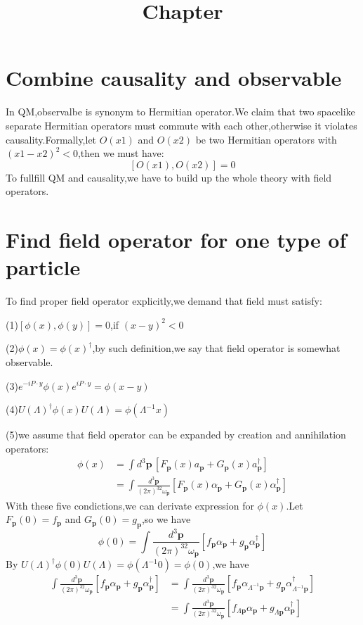 \documentclass[a4paper]{article}
\begin{document}
	\title{Chapter}
	\date{ }
	\maketitle
\section{Combine causality and observable}
In QM,observalbe is synonym to Hermitian operator.We claim that two spacelike separate Hermitian operators must commute with each other,otherwise it violates causality.Formally,let $O(x1)$ and $O(x2)$ be two Hermitian operators with $(x1-x2)^2<0$,then we must have:$$[O(x1),O(x2)]=0$$To fullfill QM and causality,we have to build up the whole theory with field operators.
\section{Find field operator for one type of particle}
To find proper field operator explicitly,we demand that field must satisfy:
\par (1)$[\phi(x),\phi(y)]=0$,if $(x-y)^2<0$
\par (2)$\phi(x)=\phi(x)^{\dagger}$,by such definition,we say that field operator is somewhat observable.
\par (3)$e^{-iP\cdot y}\phi(x)e^{iP\cdot y}=\phi(x-y)$
\par (4)$U(\Lambda)^{\dagger}\phi(x)U(\Lambda)=\phi(\Lambda^{-1}x)$
\par (5)we assume that field operator can be expanded by creation and annihilation operators:
\begin{align*}
	\phi(x)&=\int d^3\bm{p}\,[F_{\bm{p}}(x)a_{\bm{p}}+G_{\bm{p}}(x)a_{\bm{p}}^{\dagger}]\\
	&=\int\frac{d^3\bm{p}}{(2\pi)^32\omega_{\bm{p}}}[F_{\bm{p}}(x)\alpha_{\bm{p}}+G_{\bm{p}}(x)\alpha_{\bm{p}}^{\dagger}]
\end{align*}
With these five condictions,we can derivate expression for $\phi(x)$.Let $F_{\bm{p}}(0)=f_{\bm{p}}$ and $G_{\bm{p}}(0)=g_{\bm{p}}$,so we have
	$$\phi(0)=\int\frac{d^3\bm{p}}{(2\pi)^32\omega_{\bm{p}}}[f_{\bm{p}}\alpha_{\bm{p}}+g_{\bm{p}}\alpha_{\bm{p}}^{\dagger}]$$By $U(\Lambda)^{\dagger}\phi(0)U(\Lambda)=\phi(\Lambda^{-1}0)=\phi(0)$,we have
\begin{align*} \int\frac{d^3\bm{p}}{(2\pi)^32\omega_{\bm{p}}}[f_{\bm{p}}\alpha_{\bm{p}}+g_{\bm{p}}\alpha_{\bm{p}}^{\dagger}]&=\int\frac{d^3\bm{p}}{(2\pi)^32\omega_{\bm{p}}}[f_{\bm{p}}\alpha_{\Lambda^{-1}\bm{p}}+g_{\bm{p}}\alpha_{\Lambda^{-1}\bm{p}}^{\dagger}]\\
	&=\int\frac{d^3\bm{p}}{(2\pi)^32\omega_{\bm{p}}}[f_{\Lambda\bm{p}}\alpha_{\bm{p}}+g_{\Lambda\bm{p}}\alpha_{\bm{p}}^{\dagger}]
\end{align*}
\end{document}
